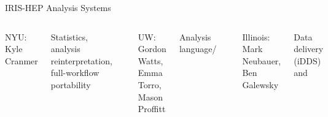 \documentclass[aspectratio=169]{beamer}
\begin{document}
\begin{frame}{IRIS-HEP Analysis Systems}
\begin{columns}[t]

{\large NYU: Kyle Cranmer}

Statistics, analysis reinterpretation, full-workflow portability

\vspace{0.2 cm}
\includegraphics[height=1.5 cm]{Kyle-Cranmer.jpg}

\vspace{0.5 cm}
{\large UW: Gordon Watts, Emma Torro, Mason Proffitt}

Analysis language/

\vspace{0.2 cm}
\includegraphics[height=1.5 cm]{Gordon-Watts.jpg}
\includegraphics[height=1.5 cm]{ETorro.png}
\includegraphics[height=1.5 cm]{Mason-Proffitt.jpg}


{\large Illinois: Mark Neubauer, Ben Galewsky}

Data delivery (iDDS) and 

\vspace{0.2 cm}
\includegraphics[height=1.5 cm]{Mark-Neubauer.png}
\includegraphics[height=1.5 cm]{Ben-Galewsky.jpg}


\end{columns}
\end{frame}
\end{document}
